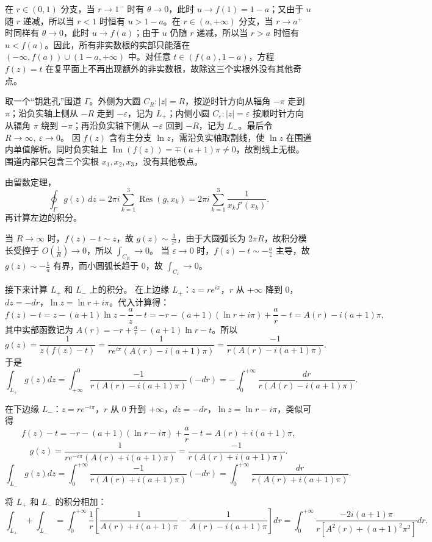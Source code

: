 \begin{solution}
在 $r\in(0,1)$ 分支，当 $r\to1^-$ 时有 $\theta\to0$，此时 $u\to f(1)=1-a$；又由于 $u$ 随 $r$ 递减，所以当 $r<1$ 时恒有 $u>1-a$。在 $r\in(a,+\infty)$ 分支，当 $r\to a^+$ 时同样有 $\theta\to0$，此时 $u\to f(a)$；由于 $u$ 仍随 $r$ 递减，所以当 $r>a$ 时恒有 $u<f(a)$。因此，所有非实数根的实部只能落在 $(-\infty,f(a))\cup(1-a,+\infty)$ 中。对任意 $t\in(f(a),1-a)$，方程 $f(z)=t$ 在复平面上不再出现额外的非实数根，故除这三个实根外没有其他奇点。

取一个“钥匙孔”围道 $\Gamma$。外侧为大圆 $C_R:|z|=R$，按逆时针方向从辐角 $-\pi$ 走到 $\pi$；沿负实轴上侧从 $-R$ 走到 $-\varepsilon$，记为 $L_+$；内侧小圆 $C_{\varepsilon}:|z|=\varepsilon$ 按顺时针方向从辐角 $\pi$ 绕到 $-\pi$；再沿负实轴下侧从 $-\varepsilon$ 回到 $-R$，记为 $L_-$。最后令 $R\to\infty,\ \varepsilon\to0$。
因 $f(z)$ 含有主分支 $\ln z$，需沿负实轴取割线，使 $\ln z$ 在围道内单值解析。同时负实轴上 $\operatorname{Im}(f(z)) = \mp(a+1)\pi \neq 0$，故割线上无根。围道内部只包含三个实根 $x_1,x_2,x_3$，没有其他极点。

由留数定理，
$$\oint_\Gamma g(z)\,dz = 2\pi i \sum_{k=1}^3 \operatorname{Res}(g,x_k)=2\pi i\sum_{k=1}^3\frac{1}{x_k f'(x_k)}.$$
再计算左边的积分。

当 $R\to\infty$ 时，$f(z)-t\sim z$，故 $g(z)\sim \frac{1}{z^2}$，由于大圆弧长为 $2\pi R$，故积分模长受控于 $O(\frac{1}{R}) \to 0$，所以 $\int_{C_R}\to0$。
当 $\varepsilon\to0$ 时，$f(z)-t\sim -\frac{a}{z}$ 主导，故 $g(z)\sim -\frac{1}{a}$ 有界，而小圆弧长趋于 0，故 $\int_{C_\varepsilon}\to0$。

接下来计算 $L_+$ 和 $L_-$ 上的积分。
在上边缘 $L_+$：$z=r e^{i\pi}$，$r$ 从 $+\infty$ 降到 $0$，$dz=-dr$，$\ln z = \ln r + i\pi$。代入计算得：
$$f(z)-t = z-(a+1)\ln z-\frac{a}{z}-t = -r-(a+1)(\ln r+i\pi)+\frac{a}{r}-t = A(r) - i(a+1)\pi,$$
其中实部函数记为 $A(r)=-r+\frac{a}{r}-(a+1)\ln r - t$。所以
$$g(z)=\frac{1}{z(f(z)-t)}=\frac{1}{r e^{i\pi}(A(r)-i(a+1)\pi)}=\frac{-1}{r(A(r)-i(a+1)\pi)}.$$
于是
$$\int_{L_+}g(z)dz = \int_{+\infty}^0 \frac{-1}{r(A(r)-i(a+1)\pi)} (-dr) = -\int_0^{+\infty} \frac{dr}{r(A(r)-i(a+1)\pi)}.$$

在下边缘 $L_-$：$z=r e^{-i\pi}$，$r$ 从 $0$ 升到 $+\infty$，$dz=-dr$，$\ln z = \ln r - i\pi$，类似可得
$$f(z)-t= -r-(a+1)(\ln r-i\pi)+\frac{a}{r}-t=A(r)+i(a+1)\pi,$$
$$g(z)=\frac{1}{r e^{-i\pi}(A(r)+i(a+1)\pi)}=\frac{-1}{r(A(r)+i(a+1)\pi)}.$$
$$\int_{L_-}g(z)dz = \int_{0}^{+\infty} \frac{-1}{r(A(r)+i(a+1)\pi)} (-dr) = \int_{0}^{+\infty} \frac{dr}{r(A(r)+i(a+1)\pi)}.$$

将 $L_+$ 和 $L_-$ 的积分相加：
$$\int_{L_+}+\int_{L_-}= \int_0^{+\infty}\frac{1}{r}\left[\frac{1}{A(r)+i(a+1)\pi} - \frac{1}{A(r)-i(a+1)\pi}\right]dr = \int_0^{+\infty}\frac{-2i(a+1)\pi}{r\left[A^2(r)+(a+1)^2\pi^2\right]}dr.$$


\end{solution}
